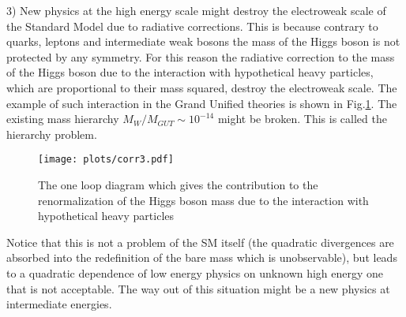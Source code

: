 \documentclass{cernyrep}
\begin{document}
3) New physics at the high energy scale might destroy the electroweak scale of the Standard Model due to radiative corrections. This is because contrary to quarks, leptons and intermediate weak bosons the mass of the Higgs boson is not protected by any symmetry. For this reason the radiative correction to the mass of the Higgs boson due to the interaction with hypothetical heavy particles, which are proportional to their mass squared, destroy the electroweak scale. The example of such interaction in the Grand Unified theories  is shown in Fig.\ref{corr}. The existing mass hierarchy $M_W/M_{GUT}\sim 10^{-14}$ might be broken. This is called the hierarchy problem.
\begin{figure}[ht!]
\begin{center}
\leavevmode
\texttt{[image: plots/corr3.pdf]}\hspace{1cm}
\end{center}
\caption{The one loop diagram which gives the contribution to the renormalization of the Higgs boson mass due to the interaction with hypothetical heavy particles}
\label{corr}
\end{figure}

Notice that this is not a problem of the SM itself (the quadratic divergences are absorbed into the redefinition of the bare mass which is unobservable), but leads to a quadratic dependence of  low energy physics on unknown high energy one that is not acceptable. The way out of this situation might be a new physics at intermediate energies.
\end{document}
